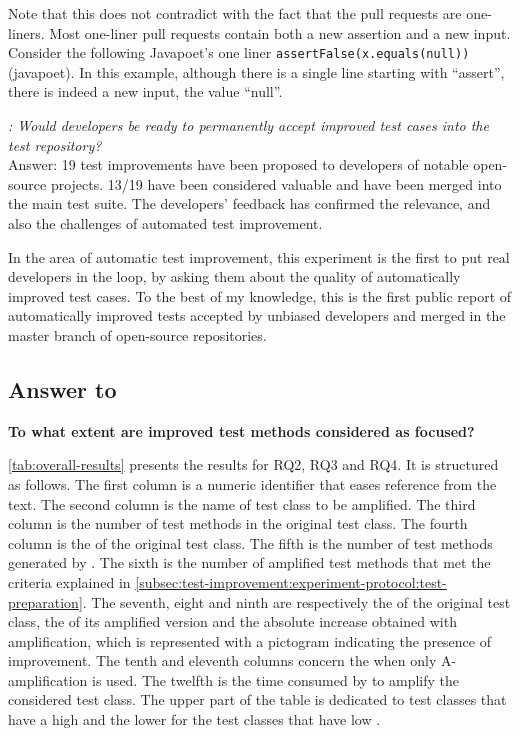 Note that this does not contradict with the fact that the pull requests are one-liners.
Most one-liner pull requests contain both a new assertion and a new input. Consider the following Javapoet's one liner \texttt{assertFalse(x.equals(null))} (javapoet). 
In this example, although there is a single line starting with ``assert'', there is indeed a new input, the value ``null''.

\begin{mdframed}
	\textit{\rqpullrequest: Would developers be ready to permanently accept improved test cases into the test repository?}\\
	Answer: 19 test improvements have been proposed to developers of notable open-source projects. 
	13/19 have been considered valuable and have been merged into the main test suite. 
	The developers' feedback has confirmed the relevance, and also the challenges of automated test improvement.
\end{mdframed}

In the area of automatic test improvement, this experiment is the first to put real developers in the loop, by asking them about the quality of automatically improved test cases.
To the best of my knowledge, this is the first public report of automatically improved tests accepted by unbiased developers and merged in the master branch of open-source repositories.



\subsection{Answer to \rqcandidates}
\label{subsec:test-improvement:experiment-results:rq2}

\textbf{\rqcandidates To what extent are improved test methods considered as focused?}

\autoref{tab:overall-results}
presents the results for RQ2, RQ3 and RQ4.%
It is structured as follows.
The first column is a numeric identifier that eases reference from the text.
The second column is the name of test class to be amplified.
The third column is the number of test methods in the original test class.
The fourth column is the \ms of the original test class.
The fifth is the number of test methods generated by \dspot.
The sixth is the number of amplified test methods that met the criteria explained in \autoref{subsec:test-improvement:experiment-protocol:test-preparation}.
The seventh, eight and ninth are respectively the \ams of the original test class, the \ams of its amplified version and the absolute increase obtained with amplification, which is represented with a pictogram indicating the presence of improvement. 
The tenth and eleventh columns concern the \ams when only A-amplification is used.
The twelfth is the time consumed by \dspot to amplify the considered test class. 
The upper part of the table is dedicated to test classes that have a high \ms and the lower for the test classes that have low \ms.

